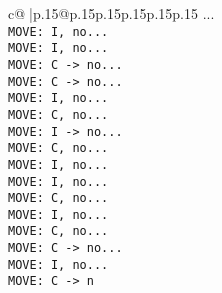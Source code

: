 \documentclass{article}
\begin{document}
{\begin{supertabular}{c@{$\;$}|p{.15\linewidth}@{}p{.15\linewidth}p{.15\linewidth}p{.15\linewidth}p{.15\linewidth}p{.15\linewidth}}
{{{...\\ \tt  MOVE: I, no...\\ \tt  MOVE: I, no...\\ \tt  MOVE: C -> no...\\ \tt  MOVE: C -> no...\\ \tt  MOVE: I, no...\\ \tt  MOVE: C, no...\\ \tt  MOVE: I -> no...\\ \tt  MOVE: C, no...\\ \tt  MOVE: I, no...\\ \tt  MOVE: I, no...\\ \tt  MOVE: C, no...\\ \tt  MOVE: I, no...\\ \tt  MOVE: C, no...\\ \tt  MOVE: C -> no...\\ \tt  MOVE: I, no...\\ \tt  MOVE: C -> n}}}
\end{supertabular}}
\end{document}
